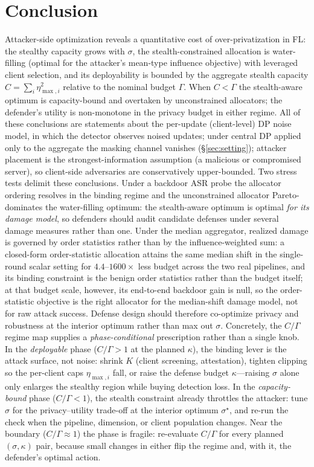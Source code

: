 \documentclass[final,1p,times]{elsarticle}
\begin{document}
\section{Conclusion}
Attacker-side optimization reveals a quantitative cost of
over-privatization in FL: the stealthy capacity grows with $\sigma$, the
stealth-constrained allocation is water-filling (optimal for the
attacker's mean-type influence objective) with leveraged client
selection, and its deployability is bounded by the aggregate stealth
capacity $C{=}\sum_i\eta_{\max,i}^2$ relative to the nominal budget
$\Gamma$. When $C{<}\Gamma$ the stealth-aware optimum is capacity-bound
and overtaken by unconstrained allocators; the defender's utility is
non-monotone in the privacy budget in either regime. All of these
conclusions are statements about the per-update (client-level) DP noise
model, in which the detector observes noised updates; under central DP
applied only to the aggregate the masking channel vanishes
(\S\ref{sec:setting}); attacker placement is the strongest-information assumption (a
malicious or compromised server), so client-side adversaries are
conservatively upper-bounded. Two stress tests
delimit these conclusions. Under a backdoor ASR probe the allocator
ordering resolves in the binding regime and the unconstrained allocator
Pareto-dominates the water-filling optimum: the stealth-aware optimum is
optimal \emph{for its damage model}, so defenders should audit candidate
defenses under several damage measures rather than one. Under the median
aggregator, realized damage is governed by order statistics rather than by
the influence-weighted sum: a closed-form order-statistic allocation
attains the same median shift in the single-round scalar setting for
$4.4$--$1600\times$ less budget across
the two real pipelines, and its binding constraint is the benign order
statistics rather than the budget itself; at that budget scale, however,
its end-to-end backdoor gain is null, so the order-statistic objective
is the right allocator for the median-shift damage model, not for raw
attack success. Defense design should
therefore co-optimize privacy and robustness at the interior optimum
rather than max out $\sigma$. Concretely, the $C/\Gamma$ regime map
supplies a \emph{phase-conditional} prescription rather than a single
knob. In the \emph{deployable} phase ($C/\Gamma{>}1$ at the planned
$\kappa$), the binding lever is the attack surface, not noise: shrink
$K$ (client screening, attestation), tighten clipping so the per-client
caps $\eta_{\max,i}$ fall, or raise the defense budget $\kappa$---raising
$\sigma$ alone only enlarges the stealthy region while buying detection
loss. In the \emph{capacity-bound} phase ($C/\Gamma{<}1$), the stealth
constraint already throttles the attacker: tune $\sigma$ for the
privacy--utility trade-off at the interior optimum $\sigma^\star$, and
re-run the check when the pipeline, dimension, or client population
changes. Near the boundary ($C/\Gamma{\approx}1$) the phase is fragile:
re-evaluate $C/\Gamma$ for every planned $(\sigma,\kappa)$ pair,
because small changes in either flip the regime and, with it, the
defender's optimal action.
\end{document}
